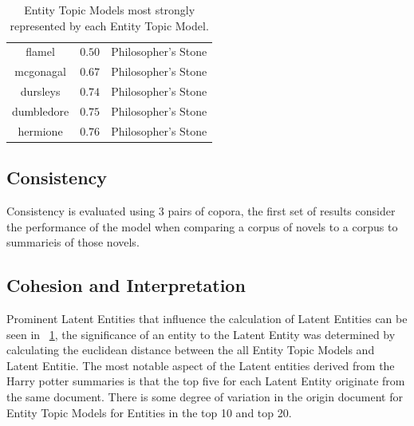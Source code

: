\documentclass[10pt]{report}
\begin{document}
\begin{table}[h!]
{\begin{tabular}{c | c | c }
    \hline
    flamel      & $ 0.50 $ & Philosopher's Stone \\
    mcgonagal   & $ 0.67 $ & Philosopher's Stone \\
    dursleys    & $ 0.74 $ & Philosopher's Stone \\
    dumbledore  & $ 0.75 $ & Philosopher's Stone \\
    hermione    & $ 0.76 $ & Philosopher's Stone 
  \end{tabular}}
  \caption{Entity Topic Models most strongly represented by each Entity Topic Model.\label{tab:hp_le_summs}}
\end{table}

\renewcommand{\baselinestretch}{2.0}\normalsize
\renewcommand{\arraystretch}{1.0}

\clearpage
\subsection{Consistency}
Consistency is evaluated using 3 pairs of copora, the first set of results consider the performance of the model when comparing a corpus of novels to a corpus to summarieis of those novels. 

\clearpage
\subsection{Cohesion and Interpretation}

Prominent Latent Entities that influence the calculation of Latent Entities can be seen in ~\ref{tab:hp_le_summs}, the significance of an entity to the Latent Entity was determined by calculating the euclidean distance between the all Entity Topic Models and Latent Entitie. The most notable aspect of the Latent entities derived from the Harry potter summaries is that the top five for each Latent Entity originate from the same document. There is some degree of variation in the origin document for Entity Topic Models for Entities in the top 10 and top 20. 
\end{document}
